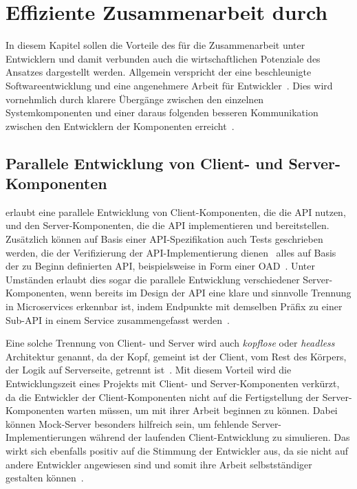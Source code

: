 \chapter{Effiziente Zusammenarbeit durch \AF}
In diesem Kapitel sollen die Vorteile des \AFAes für die Zusammenarbeit unter Entwicklern und damit verbunden auch die wirtschaftlichen Potenziale des Ansatzes dargestellt werden.
Allgemein verspricht der \AFA eine beschleunigte Softwareentwicklung und eine angenehmere Arbeit für Entwickler~\cite[354\psq]{de23}.
Dies wird vornehmlich durch klarere Übergänge zwischen den einzelnen Systemkomponenten und einer daraus folgenden besseren Kommunikation zwischen den Entwicklern der Komponenten erreicht~\cite[75]{bea22}.

\section{Parallele Entwicklung von Client- und Server-Komponenten} \label{sec:parallel-dev}
\AF erlaubt eine parallele Entwicklung von Client-Komponenten, die die \ac{API} nutzen, und den Server-Komponenten, die die \ac{API} implementieren und bereitstellen.
Zusätzlich können auf Basis einer \ac{API}-Spezifikation auch Tests geschrieben werden, die der Verifizierung der \ac{API}-Implementierung dienen \textendash\ alles auf Basis der zu Beginn definierten \ac{API}, beispielsweise in Form einer \ac{OAD}~\cite{vol22}.
Unter Umständen erlaubt dies sogar die parallele Entwicklung verschiedener Server-Komponenten, wenn bereits im Design der \ac{API} eine klare und sinnvolle Trennung in Microservices erkennbar ist, indem \bspw Endpunkte mit demselben Präfix zu einer Sub-\ac{API} in einem Service zusammengefasst werden~\cite[354]{de23}.

Eine solche Trennung von Client- und Server wird auch \emph{kopflose} oder \emph{headless} Architektur genannt, da der Kopf, gemeint ist der Client, vom Rest des Körpers, der Logik auf Serverseite, getrennt ist~\cite[5]{kul23}.
Mit diesem Vorteil wird die Entwicklungszeit eines Projekts mit Client- und Server-Komponenten verkürzt, da die Entwickler der Client-Komponenten nicht auf die Fertigstellung der Server-Komponenten warten müssen, um mit ihrer Arbeit beginnen zu können.
Dabei können Mock-Server besonders hilfreich sein, um fehlende Server-Implementierungen während der laufenden Client-Entwicklung zu simulieren.
Das wirkt sich ebenfalls positiv auf die Stimmung der Entwickler aus, da sie nicht auf andere Entwickler angewiesen sind und somit ihre Arbeit selbstständiger gestalten können~\cite[351]{de23}.

